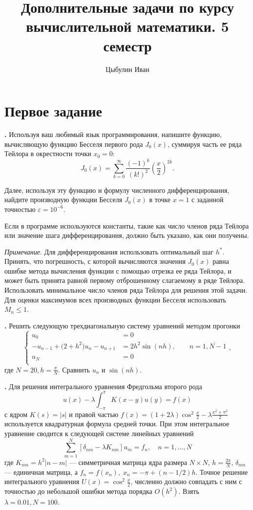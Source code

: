 \documentclass[12pt]{article}
\title{Дополнительные задачи по курсу вычислительной математики. 5 семестр}
\author{Цыбулин Иван}
\newcounter{task}
\newcommand{\problem}{\par\textbf{\stepcounter{task}\thetask. }}
\begin{document}
\maketitle

\section{Первое задание}

\problem Используя ваш любимый язык программирования, напишите функцию,
вычисляющую
функцию Бесселя первого рода $J_0(x)$, суммируя часть ее ряда Тейлора в
окрестности точки $x_0 = 0$:
\[
J_0(x) = \sum_{k = 0}^{\infty} \frac{(-1)^k}{(k!)^2}
\left(\frac{x}{2}\right)^{2k}.
\]

Далее, используя эту функцию и формулу численного дифференцирования,
найдите производную функции Бесселя $J_0(x)$ в точке $x = 1$ с заданной
точностью
$\varepsilon = 10^{-6}$.

Если в программе используются константы, такие как число членов ряда Тейлора или
значение шага дифференцирования, должно быть указано, как они получены.

\emph{Примечание}. Для дифференцирования использовать оптимальный шаг $h^*$.
Принять, что погрешность, с которой вычисляются значения $J_0(x)$ равна ошибке
метода вычисления функции с помощью отрезка ее ряда Тейлора, и может быть
принята равной первому отброшенному слагаемому в ряде Тейлора. Использовать
минимальное число членов ряда Тейлора для решения этой задачи. Для оценки
максимумов всех производных функции Бесселя использовать $M_n \leq 1$.

\problem Решить следующую трехдиагональную систему уравнений методом прогонки
\[
\begin{cases}
u_0 &= 0\\
-u_{n - 1} + \big(2 + h^2\big) u_n - u_{n+1} &= 2 h^2 \sin (nh), \qquad n =
\overline{1, N-1}\\
u_N &= 0\\
\end{cases},
\]
где $N = 20, h = \frac{\pi}{N}$. Сравнить $u_n$ и $\sin(nh)$.

\problem Для решения интегрального уравнения Фредгольма второго рода
\[
u(x) - \lambda \int_{-\pi}^\pi K(x-y) u(y) = f(x)
\]
с ядром $K(s) = |s|$ и правой частью $f(x) =(1 + 2\lambda)\cos^2 \frac{x}{2} - \lambda \frac{x^2 + \pi^2}{2}$
используется квадратурная формула средней точки. При этом интегральное уравнение
сводится к следующей системе линейных уравнений
\[
\sum_{m=1}^{N} [\delta_{nm} - \lambda K_{nm}] u_{m} = f_{n}, \quad n = 1,\dots,N
\]
где $K_{nm} = h^2|n-m|$ --- симметричная матрица ядра размера $N\times N$,
$h=\frac{2\pi}{N}$, $\delta_{nm}$ --- единичная матрица, а \mbox{$f_n =
f(x_n), \; x_n = -\pi + (n-1/2)h$}. Точное решение интегрального уравнения $U(x) =
\cos^2 \frac{x}{2}$, численно должно совпадать с ним с точностью до небольшой
ошибки метода порядка $O(h^2)$. Взять $\lambda = 0.01, N = 100$.
\end{document}
